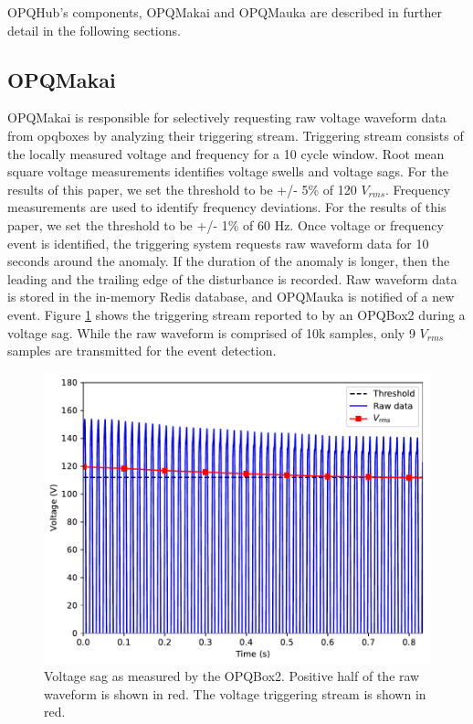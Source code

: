 \documentclass[a4paper, conference]{IEEEtran}
\begin{document}
OPQHub's components, OPQMakai and OPQMauka are described in further detail in the following sections.

\subsection{OPQMakai}

OPQMakai is responsible for selectively requesting raw voltage waveform data from opqboxes by analyzing their triggering stream. Triggering stream consists of the locally measured voltage and frequency for a 10 cycle window. Root mean square voltage measurements identifies voltage swells and voltage sags. For the results of this paper, we set the threshold to be +/- 5\% of 120 $V_{rms}$. 
Frequency measurements are used to identify frequency deviations. For the results of this paper, we set the threshold to be +/- 1\% of 60 Hz. Once voltage or frequency event is identified, the triggering system requests raw waveform data for 10 seconds around the anomaly. If the duration of the anomaly is longer, then the leading and the trailing edge of the disturbance is recorded. Raw waveform data is stored in the in-memory Redis database, and OPQMauka is notified of a new event.
Figure \ref{fig:event1} shows the triggering stream reported to by an OPQBox2 during a voltage sag. While the raw waveform is comprised of 10k samples, only 9 $V_{rms}$ samples are transmitted for the event detection.

\begin{figure}[h]
    \centering
    \includegraphics[width=0.9\columnwidth]{img/single_device_sag.pdf}
    \caption{Voltage sag as measured by the OPQBox2. Positive half of the raw waveform is shown in red. The voltage triggering stream is shown in red.}
    \label{fig:event1}
\end{figure}
\end{document}
